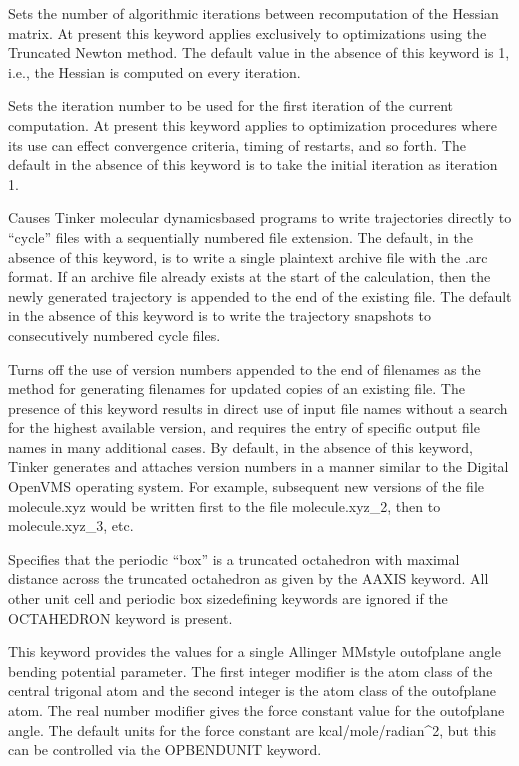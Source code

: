 \documentclass[letterpaper,11pt,english]{sphinxmanual}
\begin{document}
  Sets the number of algorithmic iterations between recomputation of the Hessian matrix. At present this keyword applies exclusively to optimizations using the Truncated Newton method. The default value in the absence of this keyword is 1, i.e., the Hessian is computed on every iteration.

  Sets the iteration number to be used for the first iteration of the current computation. At present this keyword applies to optimization procedures where its use can effect convergence criteria, timing of restarts, and so forth. The default in the absence of this keyword is to take the initial iteration as iteration 1.

  Causes Tinker molecular dynamics\sphinxhyphen{}based programs to write trajectories directly to “cycle” files with a sequentially numbered file extension. The default, in the absence of this keyword, is to write a single plain\sphinxhyphen{}text archive file with the .arc format. If an archive file already exists at the start of the calculation, then the newly generated trajectory is appended to the end of the existing file. The default in the absence of this keyword is to write the trajectory snapshots to consecutively numbered cycle files.


  Turns off the use of version numbers appended to the end of filenames as the method for generating filenames for updated copies of an existing file. The presence of this keyword results in direct use of input file names without a search for the highest available version, and requires the entry of specific output file names in many additional cases. By default, in the absence of this keyword, Tinker generates and attaches version numbers in a manner similar to the Digital OpenVMS operating system. For example, subsequent new versions of the file molecule.xyz would be written first to the file molecule.xyz\_2, then to molecule.xyz\_3, etc.

  Specifies that the periodic “box” is a truncated octahedron with maximal distance across the truncated octahedron as given by the A\sphinxhyphen{}AXIS keyword. All other unit cell and periodic box size\sphinxhyphen{}defining keywords are ignored if the OCTAHEDRON keyword is present.

  This keyword provides the values for a single Allinger MM\sphinxhyphen{}style out\sphinxhyphen{}of\sphinxhyphen{}plane angle bending potential parameter. The first integer modifier is the atom class of the central trigonal atom and the second integer is the atom class of the out\sphinxhyphen{}of\sphinxhyphen{}plane atom. The real number modifier gives the force constant value for the out\sphinxhyphen{}of\sphinxhyphen{}plane angle. The default units for the force constant are kcal/mole/radian\textasciicircum{}2, but this can be controlled via the OPBENDUNIT keyword.
\end{document}
